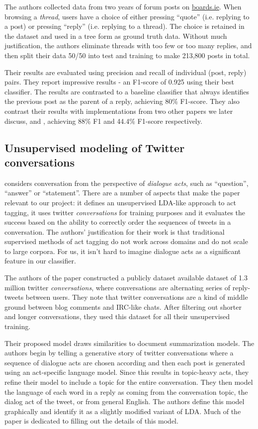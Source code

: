 \documentclass{article}
\begin{document}
The authors collected data from two years of forum posts on
\url{boards.ie}. When browsing a \textit{thread}, users have a choice of either
pressing ``quote'' (i.e. replying to a post) or pressing ``reply'' (i.e.
replying to a thread). The choice is retained in the dataset and used in a
tree form as ground truth data. Without much justification, the authors eliminate
threads with too few or too many replies, and then split their data 50/50 into 
test and training to make 213,800 posts in total.

Their results are evaluated using precision and recall of individual
(post, reply) pairs. They report impressive results - an F1-score of 0.925 using their best
classifier. The results are contrasted to a baseline classifier that always
identifies the previous post as the parent of a reply, achieving 80\% F1-score. 
They also contrast their results with implementations from two other papers we later discuss,
\cite{Elsner2008a} and \cite{Wang2008a}, achieving 88\% F1 and 44.4\% F1-score
respectively. 

\subsection{Unsupervised modeling of Twitter conversations}
\cite{Ritter2010a} considers conversation from the perspective of 
\textit{dialogue acts}, such as ``question'', ``answer'' or ``statement''. There
are a number of aspects that make the paper relevant to our project: it defines 
an unsupervised LDA-like approach to act tagging, it uses twitter \textit{conversations} for
training purposes and it evaluates the success based on the
ability to correctly order the sequences of tweets in a conversation. The
authors' justification for their work is that traditional supervised methods of
act tagging do not work across domains and do not scale to large corpora. For
us, it isn't hard to imagine dialogue acts as a significant feature in our
classifier.

The authors of the paper constructed a publicly dataset
available dataset of 1.3 million twitter \textit{conversations}, where conversations are
alternating series of reply-tweets between users. They note that twitter
conversations are a kind of middle ground between blog comments and IRC-like
chats. After filtering out shorter and longer conversations, they used this
dataset for all their unsupervised training. 

Their proposed model 
draws similarities to document summarization models. The authors begin by
telling a generative story of twitter conversations where a sequence of dialogue
acts are chosen according and then each post is
generated using an act-specific language model. Since this 
results in topic-heavy acts, they refine their model to include a
topic for the entire conversation. They then model the language of each word in a reply
as coming from the conversation topic, the dialog act of the tweet, or
from general English. The authors define this model graphically and identify it
as a slightly modified variant of LDA. Much of the paper is dedicated to
filling out the details of this model.
\end{document}
